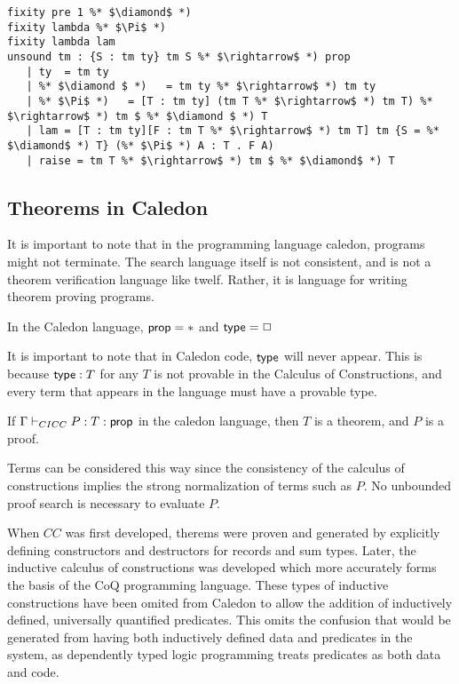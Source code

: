 \begin{lstlisting}
fixity pre 1 %* $\diamond$ *)
fixity lambda %* $\Pi$ *)
fixity lambda lam
unsound tm : {S : tm ty} tm S %* $\rightarrow$ *) prop
   | ty  = tm ty
   | %* $\diamond $ *)   = tm ty %* $\rightarrow$ *) tm ty
   | %* $\Pi$ *)   = [T : tm ty] (tm T %* $\rightarrow$ *) tm T) %* $\rightarrow$ *) tm $ %* $\diamond $ *) T
   | lam = [T : tm ty][F : tm T %* $\rightarrow$ *) tm T] tm {S = %* $\diamond$ *) T} (%* $\Pi$ *) A : T . F A)
   | raise = tm T %* $\rightarrow$ *) tm $ %* $\diamond$ *) T
\end{lstlisting}

\subsection{Theorems in Caledon}

It is important to note that in the programming language caledon, programs might not terminate.  
The search language itself is not consistent, and is not a theorem verification language like twelf.  
Rather, it is language for writing theorem proving programs.  

\begin{definition}
In the Caledon language, $\mathsf{prop} = *$ and $\mathsf{type} = \Box$
\end{definition}

It is important to note that in Caledon code, $\mathsf{type}$ will never appear.  This is because $\mathsf{type} : T$ for any $T$
is not provable in the Calculus of Constructions, and every term that appears in the language must have a provable type.

\begin{definition}
If $\Gamma \vdash_{CICC} P : T : \mathsf{prop}$ in the caledon language, then $T$ is a theorem, and $P$ is a proof.
\end{definition}

Terms can be considered this way since the consistency of the calculus of constructions implies the strong normalization
of terms such as $P$.  No unbounded proof search is necessary to evaluate $P$.

When $CC$ was first developed, therems were proven and generated by explicitly defining
constructors and destructors for records and sum types.  Later, the inductive calculus of constructions was developed 
\citep{coquand1990inductively} which more accurately forms the basis of the CoQ programming language.  These types of inductive
constructions have been omited from Caledon to allow the addition of inductively defined, universally quantified predicates.
This omits the confusion that would be generated from having both inductively defined data and predicates in the system, as 
dependently typed logic programming treats predicates as both data and code.

